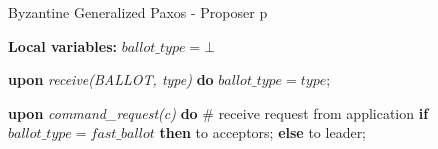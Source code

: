 \begin{algorithm}[!t] 
	\caption{Byzantine Generalized Paxos - Proposer p}
	\label{BFT-Prop}
	\textbf{Local variables:} $ballot\_type = \bot$
	\begin{algorithmic}[1]
			
		\State \textbf{upon} \textit{receive(BALLOT, type)} \textbf{do} 
		\State \hspace{\algorithmicindent} $ballot\_type = type$;
		\State
		
		\State \textbf{upon} \textit{command\_request(c)} \textbf{do}   \hspace{\algorithmicindent}\hspace{\algorithmicindent}\hspace{\algorithmicindent}\hspace{\algorithmicindent}\# receive request from application
		\State \hspace{\algorithmicindent} \textbf{if} $ballot\_type = fast\_ballot$ \textbf{then}
		\State \hspace{\algorithmicindent}\hspace{\algorithmicindent}  to acceptors;
		\State \hspace{\algorithmicindent} \textbf{else} 
		\State \hspace{\algorithmicindent}\hspace{\algorithmicindent}  to leader;		
	\end{algorithmic}
\end{algorithm}

